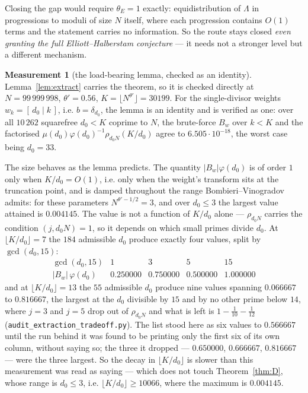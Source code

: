 \documentclass[11pt,a4paper]{article}
\theoremstyle{plain}
\theoremstyle{definition}
\newtheorem{measurement}[theorem]{Measurement}
\theoremstyle{remark}
\begin{document}
Closing the gap would require $\theta_E=1$ exactly: equidistribution
of $\Lambda$ in progressions to moduli of size $N$ itself, where each
progression contains $O(1)$ terms and the statement carries no
information. So the route stays closed \emph{even granting the full
Elliott--Halberstam conjecture} --- it needs not a stronger level but
a different mechanism.

\begin{measurement}[the load-bearing lemma, checked as an identity]%
\label{meas:extract}
Lemma~\ref{lem:extract} carries the theorem, so it is checked
directly at $N=99\,999\,998$, $\theta'=0.56$,
$K=\lfloor N^{\theta'}\rfloor=30199$. For the single-divisor weights
$w_k=[\,d_0\mid k\,]$, i.e. $b=\delta_{d_0}$, the lemma is an identity
and is verified as one: over all $10\,262$ squarefree $d_0<K$ coprime
to $N$, the brute-force $B_w$ over $k<K$ and the factorised
$\mu(d_0)\varphi(d_0)^{-1}\rho_{d_0N}(K/d_0)$ agree to
$6.505\cdot10^{-18}$, the worst case being $d_0=33$.

The size behaves as the lemma predicts. The quantity
$|B_w|\varphi(d_0)$ is of order $1$ only when $K/d_0=O(1)$, i.e. only
when the weight's transform sits at the truncation point, and is
damped throughout the range Bombieri--Vinogradov admits: for these
parameters $N^{\theta'-1/2}=3$, and over $d_0\le3$ the largest value
attained is $0.004145$. The value is not a function of $K/d_0$ alone
--- $\rho_{d_0N}$ carries the condition $(j,d_0N)=1$, so it depends on
which small primes divide $d_0$. At $\lfloor K/d_0\rfloor=7$ the $184$
admissible $d_0$ produce exactly four values, split by $\gcd(d_0,15)$:
\[
\begin{array}{r|cccc}
 \gcd(d_0,15) & 1 & 3 & 5 & 15\\\hline
 |B_w|\,\varphi(d_0) & 0.250000 & 0.750000 & 0.500000 & 1.000000
\end{array}
\]
and at $\lfloor K/d_0\rfloor=13$ the $55$ admissible $d_0$ produce nine
values spanning $0.066667$ to $0.816667$, the largest at
the $d_0$ divisible by $15$ and by no other prime below $14$, where
$j=3$ and $j=5$ drop out of $\rho_{d_0N}$ and what is left is
$1-\tfrac1{10}-\tfrac1{12}$
(\texttt{audit\_extraction\_tradeoff.py}). The list stood here as six
values to $0.566667$ until the run behind it was found to be printing
only the first six of its own column, without saying so; the three
it dropped --- $0.650000$, $0.666667$, $0.816667$ --- were the three
largest. So the decay in $\lfloor K/d_0\rfloor$
is slower than this measurement was read as saying --- which does not
touch Theorem~\ref{thm:D}, whose range is $d_0\le3$, i.e.
$\lfloor K/d_0\rfloor\ge10066$, where the maximum is $0.004145$.
\end{measurement}
\end{document}

